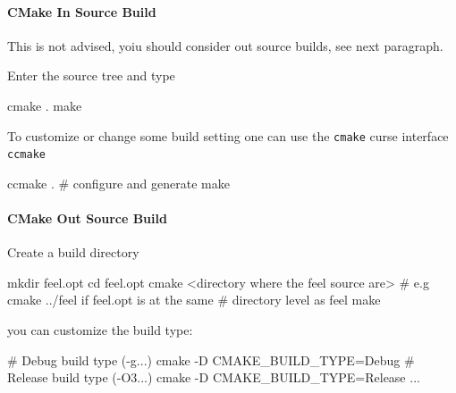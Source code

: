 \documentclass[a4paper]{book}
\newcommand{\feel}{Feel\xspace}
\newcommand{\cmake}{\texttt{cmake}\xspace}
\newcommand{\ccmake}{\texttt{ccmake}\xspace}
\begin{document}
\paragraph{CMake In Source Build}

This is not advised, yoiu should consider out source builds, see next paragraph.

Enter the source tree and type
\begin{unixcom}
  cmake .
  make
\end{unixcom}

To customize or change some build setting one can use the \cmake curse interface
\ccmake
\begin{unixcom}
  ccmake . # configure and generate
  make
\end{unixcom}

\paragraph{CMake Out Source Build}

Create a build directory
\begin{unixcom}
  mkdir feel.opt
  cd feel.opt
  cmake <directory where the feel source are>
  # e.g cmake ../feel if feel.opt is at the same
  # directory level as feel
  make
\end{unixcom}

you can customize the build type:
\begin{unixcom}
  # Debug build type (-g...)
  cmake -D CMAKE_BUILD_TYPE=Debug
  # Release build type (-O3...)
  cmake -D CMAKE_BUILD_TYPE=Release
  ...
\end{unixcom}






\end{document}
